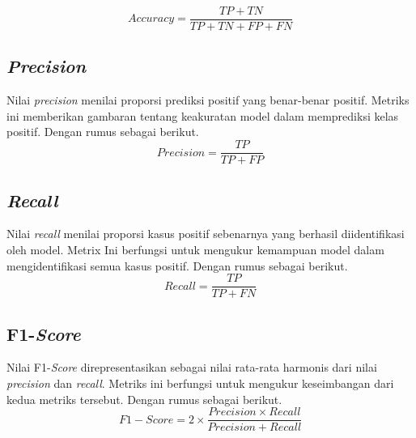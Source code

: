 \begin{equation}
    Accuracy = \frac{TP + TN}{TP + TN + FP + FN}
\end{equation}

\subsection{\textit{Precision}}
Nilai \textit{precision} menilai proporsi prediksi positif yang benar-benar positif. Metriks ini memberikan gambaran tentang keakuratan model dalam memprediksi kelas positif. Dengan rumus sebagai berikut.
\begin{equation}
    Precision = \frac{TP}{TP + FP}
\end{equation}

\subsection{\textit{Recall}}
Nilai \textit{recall} menilai proporsi kasus positif sebenarnya yang berhasil diidentifikasi oleh model. Metrix Ini berfungsi untuk mengukur kemampuan model dalam mengidentifikasi semua kasus positif. Dengan rumus sebagai berikut.
\begin{equation}
    Recall = \frac{TP}{TP + FN}
\end{equation}

\subsection{F1-\textit{Score}}
Nilai F1-\textit{Score} direpresentasikan sebagai nilai rata-rata harmonis dari nilai \textit{precision} dan \textit{recall}. Metriks ini berfungsi untuk mengukur keseimbangan dari kedua metriks tersebut. Dengan rumus sebagai berikut.
\begin{equation}
    F1-Score = 2 \times \frac{Precision \times Recall}{Precision + Recall}
\end{equation}
